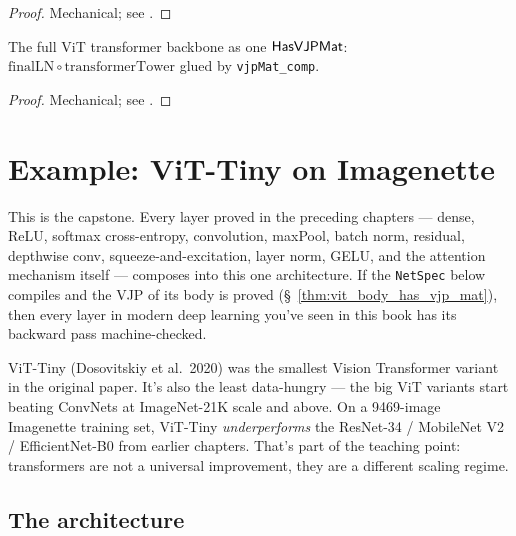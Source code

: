 \begin{proof}
\leanok
Mechanical; see .
\end{proof}

\begin{theorem}
  \label{thm:vit_body_has_vjp_mat}
  \leanok
  The full ViT transformer backbone as one \(\mathsf{HasVJPMat}\):
  \(\mathrm{finalLN} \circ \mathrm{transformerTower}\) glued by
  \texttt{vjpMat\_comp}.
\end{theorem}

\begin{proof}
\leanok
Mechanical; see .
\end{proof}

\section{Example: ViT-Tiny on Imagenette}
\label{sec:attention_vit_example}

This is the capstone. Every layer proved in the preceding chapters
--- dense, ReLU, softmax cross-entropy, convolution, maxPool,
batch norm, residual, depthwise conv, squeeze-and-excitation, layer
norm, GELU, and the attention mechanism itself --- composes into
this one architecture. If the \texttt{NetSpec} below compiles and
the VJP of its body is proved (\S~\ref{thm:vit_body_has_vjp_mat}),
then every layer in modern deep learning you've seen in this book
has its backward pass machine-checked.

ViT-Tiny (Dosovitskiy et al.\ 2020) was the smallest Vision
Transformer variant in the original paper. It's also the least
data-hungry --- the big ViT variants start beating ConvNets at
ImageNet-21K scale and above. On a 9469-image Imagenette training
set, ViT-Tiny \emph{underperforms} the ResNet-34 / MobileNet V2 /
EfficientNet-B0 from earlier chapters. That's part of the teaching
point: transformers are not a universal improvement, they are a
different scaling regime.

\subsection*{The architecture}

